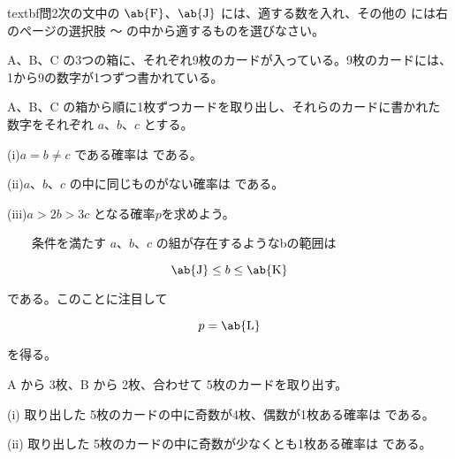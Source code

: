 textbf{問2}\qquad 次の文中の $\ab{\textrm{F}}$、$\ab{\textrm{J}}$ には、適する数を入れ、その他の \ab{\ } には右のぺージの選択肢  〜  の中から適するものを選びなさい。

\vspace{1em}

A、B、C の3つの箱に、それぞれ9枚のカードが入っている。9枚のカードには、1から9の数字が1つずつ書かれている。

\vspace{1em}

A、B、C の箱から順に1枚ずつカードを取り出し、それらのカードに書かれた数字をそれぞれ $a$、$b$、$c$ とする。

\vspace{0.5em}

(i)\qquad $a = b \neq c$ である確率は  である。

\vspace{0.5em}

(ii)\qquad $a$、$b$、$c$ の中に同じものがない確率は  である。

\vspace{0.5em}

(iii)\qquad $a > 2b > 3c$ となる確率$p$を求めよう。

\quad\quad\ \ \ \  条件を満たす $a$、$b$、$c$ の組が存在するようなbの範囲は

\[\ab{\textrm{J}} \leq b \leq \ab{\textrm{K}}\]

である。このことに注目して

\[p = \ab{\textrm{L}}\]

を得る。

\vspace{1em}

A から 3枚、B から 2枚、合わせて 5枚のカードを取り出す。

\vspace{0.5em}

(i) 取り出した 5枚のカードの中に奇数が4枚、偶数が1枚ある確率は  である。

\vspace{0.5em}

(ii) 取り出した 5枚のカードの中に奇数が少なくとも1枚ある確率は  である。



